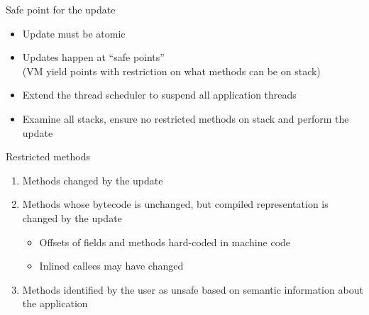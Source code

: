 \begin{frame}[t,fragile,label=suspend]{Safe point for the update}%
\begin{itemize}
\item Update must be atomic
\item Updates happen at ``safe points''\\
      (VM yield points with restriction on what methods can be on stack)
\item Extend the thread scheduler to suspend all application threads
\item Examine all stacks, ensure no restricted methods on stack and perform
      the update
\end{itemize}
\end{frame}

\begin{frame}[t,fragile]{Restricted methods}%
\begin{enumerate}[(1)]
\item Methods changed by the update
\item Methods whose bytecode is unchanged, but compiled representation is
      changed by the update
  \begin{itemize}
  \item Offsets of fields and methods hard-coded in machine code
  \item Inlined callees may have changed
  \end{itemize}
\item Methods identified by the user as unsafe based on semantic
information about the application
\end{enumerate}
\end{frame}


